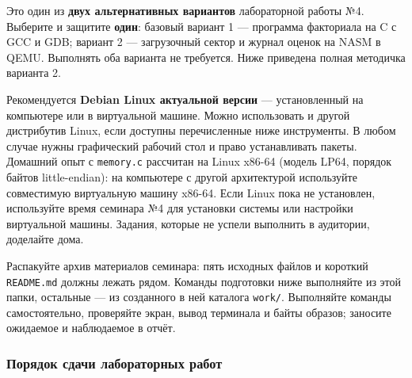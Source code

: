Это один из \textbf{двух альтернативных вариантов} лабораторной работы
№4. Выберите и защитите \textbf{один}: базовый вариант 1 --- программа
факториала на C с GCC и GDB; вариант 2 --- загрузочный сектор и журнал
оценок на NASM в QEMU. Выполнять оба варианта не требуется. Ниже
приведена полная методичка варианта 2.

Рекомендуется \textbf{Debian Linux актуальной версии} --- установленный
на компьютере или в виртуальной машине. Можно использовать и другой
дистрибутив Linux, если доступны перечисленные ниже инструменты. В любом
случае нужны графический рабочий стол и право устанавливать пакеты.
Домашний опыт с \texttt{memory.c} рассчитан на Linux x86-64 (модель
LP64, порядок байтов little-endian): на компьютере с другой архитектурой
используйте совместимую виртуальную машину x86-64. Если Linux пока не
установлен, используйте время семинара №4 для установки системы или
настройки виртуальной машины. Задания, которые не успели выполнить в
аудитории, доделайте дома.

Распакуйте архив материалов семинара: пять исходных файлов и короткий
\texttt{README.md} должны лежать рядом. Команды подготовки ниже
выполняйте из этой папки, остальные --- из созданного в ней каталога
\texttt{work/}. Выполняйте команды самостоятельно, проверяйте экран,
вывод терминала и байты образов; заносите ожидаемое и наблюдаемое в
отчёт.

\hypertarget{ux43fux43eux440ux44fux434ux43eux43a-ux441ux434ux430ux447ux438-ux43bux430ux431ux43eux440ux430ux442ux43eux440ux43dux44bux445-ux440ux430ux431ux43eux442}{%
\subsubsection{Порядок сдачи лабораторных
работ}\label{ux43fux43eux440ux44fux434ux43eux43a-ux441ux434ux430ux447ux438-ux43bux430ux431ux43eux440ux430ux442ux43eux440ux43dux44bux445-ux440ux430ux431ux43eux442}}

